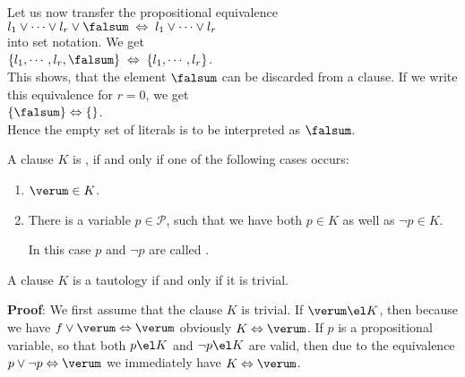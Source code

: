 Let us now transfer the propositional equivalence
\\[0.2cm]
\hspace*{1.3cm}
$l_1 \vee \cdots \vee l_r \vee \falsum \;\Leftrightarrow\; l_1 \vee \cdots \vee l_r$
\\[0.2cm]
into set notation.  We get
\\[0.2cm]
\hspace*{1.3cm}
$\{ l_1, \cdots, l_r, \falsum \} \;\Leftrightarrow\; \{ l_1, \cdots, l_r \}$.
\\[0.2cm]
This shows, that the element $\falsum$ can be discarded from a clause.  If we write this equivalence for $r=0$,
we get
\\[0.2cm]
\hspace*{1.3cm}
$\{\falsum \} \Leftrightarrow \{\}$.
\\[0.2cm]
Hence the empty set of literals is to be interpreted as $\falsum$.

\begin{Definition}
  A clause $K$ is , if and only if one of the following cases occurs:
  \begin{enumerate}
  \item $\verum \in K$.
  \item There is a variable  $p \in \mathcal{P}$, such that we have both $p \in K$ as well as $\neg p \in K$.

        In this case $p$ and $\neg p$ are called  .
        \eox
\end{enumerate}
\end{Definition}

\begin{Proposition} \label{satz:trivial}
  A clause $K$ is a tautology if and only if it is trivial.
\end{Proposition}
\textbf{Proof}:  We first assume that the clause $K$ is trivial.
If $\verum \el K$, then because we have
$f \vee \verum \Leftrightarrow \verum$
obviously $K \Leftrightarrow \verum$.   If $p$ is a propositional variable, so that
both $p \el K$ and $\neg p \el K$ are valid, then due to the equivalence $p \vee
\neg p \Leftrightarrow \verum$ we immediately have $K \Leftrightarrow \verum$.

